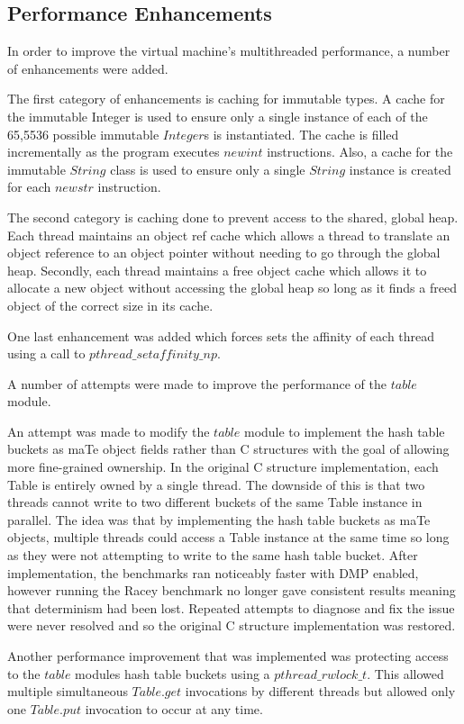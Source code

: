 \subsection{Performance Enhancements}

In order to improve the virtual machine's multithreaded performance, a
number of enhancements were added.

The first category of enhancements is caching for immutable types.  A
cache for the immutable Integer is used to ensure only a single
instance of each of the 65,5536 possible immutable $Integer$s is
instantiated.  The cache is filled incrementally as the program
executes $newint$ instructions.  Also, a cache for the immutable
$String$ class is used to ensure only a single $String$ instance is
created for each $newstr$ instruction.

The second category is caching done to prevent access to the shared,
global heap.  Each thread maintains an object ref cache which allows a
thread to translate an object reference to an object pointer without
needing to go through the global heap.  Secondly, each thread
maintains a free object cache which allows it to allocate a new object
without accessing the global heap so long as it finds a freed object
of the correct size in its cache.

One last enhancement was added which forces sets the affinity of each
thread using a call to $pthread\_setaffinity\_np$.

A number of attempts were made to improve the performance of the
$table$ module.

An attempt was made to modify the $table$ module to implement the hash
table buckets as maTe object fields rather than C structures with the
goal of allowing more fine-grained ownership.  In the original C
structure implementation, each Table is entirely owned by a single
thread.  The downside of this is that two threads cannot write to two
different buckets of the same Table instance in parallel.  The idea
was that by implementing the hash table buckets as maTe objects,
multiple threads could access a Table instance at the same time so
long as they were not attempting to write to the same hash table
bucket.  After implementation, the benchmarks ran noticeably faster
with DMP enabled, however running the Racey benchmark no longer gave
consistent results meaning that determinism had been lost.  Repeated
attempts to diagnose and fix the issue were never resolved and so the
original C structure implementation was restored.

Another performance improvement that was implemented was protecting
access to the $table$ modules hash table buckets using a
$pthread\_rwlock\_t$.  This allowed multiple simultaneous $Table.get$
invocations by different threads but allowed only one $Table.put$
invocation to occur at any time.

